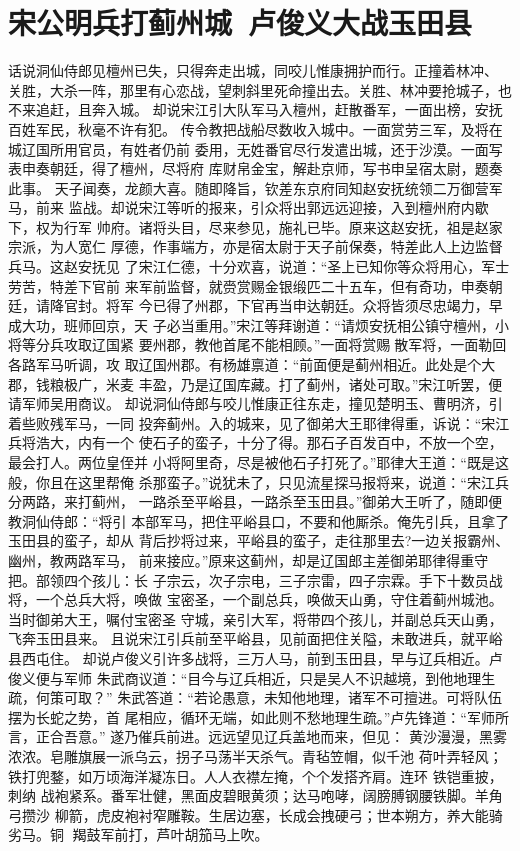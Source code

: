 \chapter{宋公明兵打蓟州城~卢俊义大战玉田县}

话说洞仙侍郎见檀州已失，只得奔走出城，同咬儿惟康拥护而行。正撞着林冲、
关胜，大杀一阵，那里有心恋战，望刺斜里死命撞出去。关胜、林冲要抢城子，也
不来追赶，且奔入城。
却说宋江引大队军马入檀州，赶散番军，一面出榜，安抚百姓军民，秋毫不许有犯。
传令教把战船尽数收入城中。一面赏劳三军，及将在城辽国所用官员，有姓者仍前
委用，无姓番官尽行发遣出城，还于沙漠。一面写表申奏朝廷，得了檀州，尽将府
库财帛金宝，解赴京师，写书申呈宿太尉，题奏此事。
天子闻奏，龙颜大喜。随即降旨，钦差东京府同知赵安抚统领二万御营军马，前来
监战。却说宋江等听的报来，引众将出郭远远迎接，入到檀州府内歇下，权为行军
帅府。诸将头目，尽来参见，施礼已毕。原来这赵安抚，祖是赵家宗派，为人宽仁
厚德，作事端方，亦是宿太尉于天子前保奏，特差此人上边监督兵马。这赵安抚见
了宋江仁德，十分欢喜，说道：“圣上已知你等众将用心，军士劳苦，特差下官前
来军前监督，就赍赏赐金银缎匹二十五车，但有奇功，申奏朝廷，请降官封。将军
今已得了州郡，下官再当申达朝廷。众将皆须尽忠竭力，早成大功，班师回京，天
子必当重用。”宋江等拜谢道：“请烦安抚相公镇守檀州，小将等分兵攻取辽国紧
要州郡，教他首尾不能相顾。”一面将赏赐散军将，一面勒回各路军马听调，攻
取辽国州郡。有杨雄禀道：“前面便是蓟州相近。此处是个大郡，钱粮极广，米麦
丰盈，乃是辽国库藏。打了蓟州，诸处可取。”宋江听罢，便请军师吴用商议。
却说洞仙侍郎与咬儿惟康正往东走，撞见楚明玉、曹明济，引着些败残军马，一同
投奔蓟州。入的城来，见了御弟大王耶律得重，诉说：“宋江兵将浩大，内有一个
使石子的蛮子，十分了得。那石子百发百中，不放一个空，最会打人。两位皇侄并
小将阿里奇，尽是被他石子打死了。”耶律大王道：“既是这般，你且在这里帮俺
杀那蛮子。”说犹未了，只见流星探马报将来，说道：“宋江兵分两路，来打蓟州，
一路杀至平峪县，一路杀至玉田县。”御弟大王听了，随即便教洞仙侍郎：“将引
本部军马，把住平峪县口，不要和他厮杀。俺先引兵，且拿了玉田县的蛮子，却从
背后抄将过来，平峪县的蛮子，走往那里去?一边关报霸州、幽州，教两路军马，
前来接应。”原来这蓟州，却是辽国郎主差御弟耶律得重守把。部领四个孩儿：长
子宗云，次子宗电，三子宗雷，四子宗霖。手下十数员战将，一个总兵大将，唤做
宝密圣，一个副总兵，唤做天山勇，守住着蓟州城池。当时御弟大王，嘱付宝密圣
守城，亲引大军，将带四个孩儿，并副总兵天山勇，飞奔玉田县来。
且说宋江引兵前至平峪县，见前面把住关隘，未敢进兵，就平峪县西屯住。
却说卢俊义引许多战将，三万人马，前到玉田县，早与辽兵相近。卢俊义便与军师
朱武商议道：“目今与辽兵相近，只是吴人不识越境，到他地理生疏，何策可取？”
朱武答道：“若论愚意，未知他地理，诸军不可擅进。可将队伍摆为长蛇之势，首
尾相应，循环无端，如此则不愁地理生疏。”卢先锋道：“军师所言，正合吾意。”
遂乃催兵前进。远远望见辽兵盖地而来，但见：
黄沙漫漫，黑雾浓浓。皂雕旗展一派乌云，拐子马荡半天杀气。青毡笠帽，似千池
荷叶弄轻风；铁打兜鍪，如万顷海洋凝冻日。人人衣襟左掩，个个发搭齐肩。连环
铁铠重披，刺纳
战袍紧系。番军壮健，黑面皮碧眼黄须；达马咆哮，阔膀膊钢腰铁脚。羊角弓攒沙
柳箭，虎皮袍衬窄雕鞍。生居边塞，长成会拽硬弓；世本朔方，养大能骑劣马。铜
羯鼓军前打，芦叶胡笳马上吹。

